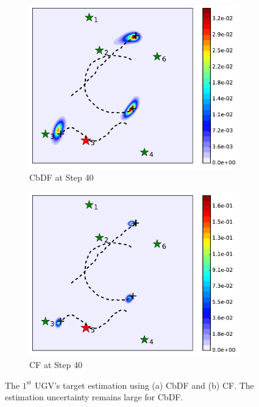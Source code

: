 	\begin{figure}%
		\centering	
		\begin{subfigure}[b]{0.23\textwidth}
			\includegraphics[width=\textwidth]{figures/cons_hetero_mov_sen_mov_tar_rbt5_step40}
			\caption{CbDF at Step 40}\label{fig:cbdf_step40}
		\end{subfigure}	
		\begin{subfigure}[b]{0.23\textwidth}
			\includegraphics[width=\textwidth]{figures/cent_hetero_mov_sen_mov_tar_rbt1_step40}
			\caption{CF at Step 40}\label{fig:cf_step40}
		\end{subfigure}
		\caption{The $1^\text{st}$ UGV's target estimation using (a) CbDF and (b) CF. The estimation uncertainty remains large for CbDF.}
	\end{figure}



